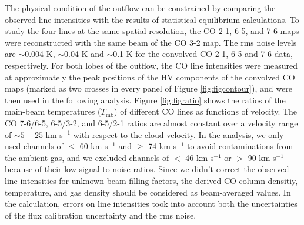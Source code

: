 The physical condition of the outflow can be constrained by comparing the observed line intensities with the results of statistical-equilibrium calculations. To study the four lines at the same spatial resolution, the CO 2-1, 6-5, and 7-6 maps were reconstructed with the same beam of the CO 3-2 map. The rms noise levels are $\sim$0.004 K, $\sim$0.04 K and $\sim$0.1 K for the convolved CO 2-1, 6-5 and 7-6 data, respectively. For both lobes of the outflow, the CO line intensities were measured at approximately the peak positions of the HV components of the convolved CO maps (marked as two crosses in every panel of Figure \ref{fig:figcontour}), and were then used in the following analysis. Figure \ref{fig:figratio} shows the ratios of the main-beam temperatures ($T_{\mathrm{mb}}$) of different CO lines as functions of velocity. The CO 7-6/6-5, 6-5/3-2, and 6-5/2-1 ratios are almost constant over a velocity range of $\sim 5-25$ km s$^{-1}$ with respect to the cloud velocity. In the analysis, we only used channels of $\le$ 60 km s$^{-1}$ and $\ge$ 74 km s$^{-1}$ to avoid contaminations from the ambient gas, and we excluded channels of $<$ 46 km s$^{-1}$ or $>$ 90 km s$^{-1}$ because of their low signal-to-noise ratios. Since we didn't correct the observed line intensities for unknown beam filling factors, the derived CO column densitiy, temperature, and gas density should be considered as beam-averaged values. In the calculation, errors on line intensities took into account both the uncertainties of the flux calibration uncertainty and the rms noise. 


